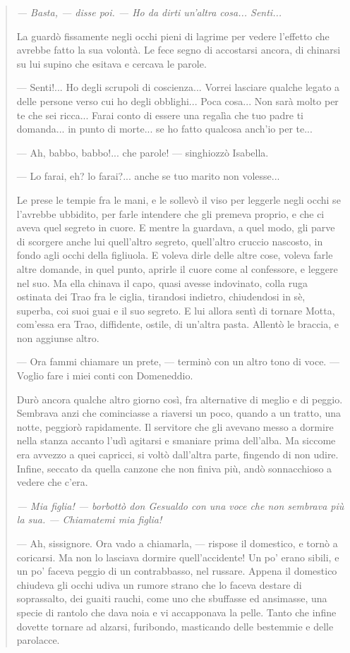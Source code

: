 \documentclass{book}
\newcounter{mar}
\begin{document}
\begin{quote}
\textit{— Basta, — disse poi. — Ho da dirti un’altra cosa... Senti...}

La guardò fissamente negli occhi pieni di lagrime per vedere l’effetto che avrebbe fatto la sua volontà. Le fece segno di accostarsi ancora, di chinarsi su lui supino che esitava e cercava le parole.

— Senti!... Ho degli scrupoli di coscienza... Vorrei lasciare qualche legato a delle persone verso cui ho degli obblighi... Poca cosa... Non sarà molto per te che sei ricca... Farai conto di essere una regalìa che tuo padre ti domanda... in punto di morte... se ho fatto qualcosa anch’io per te...

— Ah, babbo, babbo!... che parole! — singhiozzò Isabella.

— Lo farai, eh? lo farai?... anche se tuo marito non volesse...

Le prese le tempie fra le mani, e le sollevò il viso per leggerle negli occhi se l’avrebbe ubbidito, per farle intendere che gli premeva proprio, e che ci aveva quel segreto in cuore. E mentre la guardava, a quel modo, gli parve di scorgere anche lui quell’altro segreto, quell’altro cruccio nascosto, in fondo agli occhi della figliuola. E voleva dirle delle altre cose, voleva farle altre domande, in quel punto, aprirle il cuore come al confessore, e leggere nel suo. Ma ella chinava il capo, quasi avesse indovinato, colla ruga ostinata dei Trao fra le ciglia, tirandosi indietro, chiudendosi in sè, superba, coi suoi guai e il suo segreto. E lui allora sentì di tornare Motta, com’essa era Trao, diffidente, ostile, di un’altra pasta. Allentò le braccia, e non aggiunse altro.

— Ora fammi chiamare un prete, — terminò con un altro tono di voce. — Voglio fare i miei conti con Domeneddio.

Durò ancora qualche altro giorno così, fra alternative di meglio e di peggio. Sembrava anzi che cominciasse a riaversi un poco, quando a un tratto, una notte, peggiorò rapidamente. Il servitore che gli avevano messo a dormire nella stanza accanto l’udì agitarsi e smaniare prima dell’alba. Ma siccome era avvezzo a quei capricci, si voltò dall’altra parte, fingendo di non udire. Infine, seccato da quella canzone che non finiva più, andò sonnacchioso a vedere che c’era.

\textit{— Mia figlia! — borbottò don Gesualdo con una voce che non sembrava più la sua. — Chiamatemi mia figlia!}

— Ah, sissignore. Ora vado a chiamarla, — rispose il domestico, e tornò a coricarsi.
Ma non lo lasciava dormire quell’accidente! Un po’ erano sibili, e un po’ faceva peggio di un contrabbasso, nel russare. Appena il domestico chiudeva gli occhi udiva un rumore strano che lo faceva destare di soprassalto, dei guaiti rauchi, come uno che sbuffasse ed ansimasse, una specie di rantolo che dava noia e vi accapponava la pelle. Tanto che infine dovette tornare ad alzarsi, furibondo, masticando delle bestemmie e delle parolacce.


\end{quote}
\end{document}

